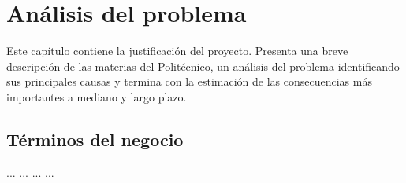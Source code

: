 \chapter{Análisis del problema}
\label{cap:analisis}

Este capítulo contiene la justificación del proyecto. Presenta una breve descripción de las materias del Politécnico, un análisis del problema identificando sus principales causas y termina con la estimación de las consecuencias más importantes a mediano y largo plazo.

\section{Términos del negocio}
\label{sec:terminosDeNegocio}
\begin{brGlosario}[
	version=1.0, 
	author=Gabriela Moreno, 
	revisor=Ulises Pérez, 
	status =\cdtStEdition
]
	 ...
	 ...
	 ...
	 ...

%	
%	
%	
%	
%
%	
%	
\end{brGlosario}




